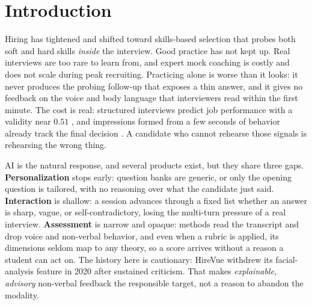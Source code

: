 \documentclass[11pt]{article}
\begin{document}
\section{Introduction}
Hiring has tightened and shifted toward skills-based selection that probes both soft and hard skills \emph{inside} the interview. Good practice has not kept up. Real interviews are too rare to learn from, and expert mock coaching is costly and does not scale during peak recruiting. Practicing alone is worse than it looks: it never produces the probing follow-up that exposes a thin answer, and it gives no feedback on the voice and body language that interviewers read within the first minute. The cost is real: structured interviews predict job performance with a validity near $0.51$ \citep{schmidt1998validity}, and impressions formed from a few seconds of behavior already track the final decision \citep{ambady1992thin}. A candidate who cannot rehearse those signals is rehearsing the wrong thing.

AI is the natural response, and several products exist, but they share three gaps. \textbf{Personalization} stops early: question banks are generic, or only the opening question is tailored, with no reasoning over what the candidate just said. \textbf{Interaction} is shallow: a session advances through a fixed list whether an answer is sharp, vague, or self-contradictory, losing the multi-turn pressure of a real interview. \textbf{Assessment} is narrow and opaque: methods read the transcript and drop voice and non-verbal behavior, and even when a rubric is applied, its dimensions seldom map to any theory, so a score arrives without a reason a student can act on. The history here is cautionary: HireVue withdrew its facial-analysis feature in 2020 after sustained criticism. That makes \emph{explainable, advisory} non-verbal feedback the responsible target, not a reason to abandon the modality.
\end{document}
